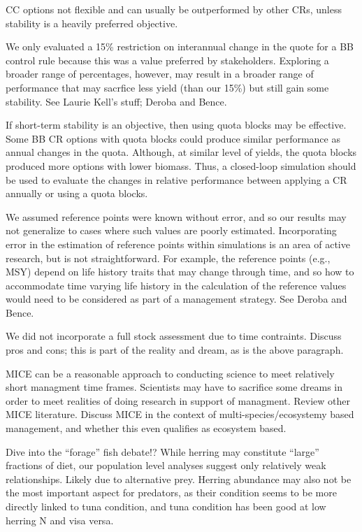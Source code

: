 \documentclass[]{article}
\begin{document}
CC options not flexible and can usually be outperformed by other CRs,
unless stability is a heavily preferred objective.

We only evaluated a 15\% restriction on interannual change in the quote
for a BB control rule because this was a value preferred by
stakeholders. Exploring a broader range of percentages, however, may
result in a broader range of performance that may sacrfice less yield
(than our 15\%) but still gain some stability. See Laurie Kell's stuff;
Deroba and Bence.

If short-term stability is an objective, then using quota blocks may be
effective. Some BB CR options with quota blocks could produce similar
performance as annual changes in the quota. Although, at similar level
of yields, the quota blocks produced more options with lower biomass.
Thus, a closed-loop simulation should be used to evaluate the changes in
relative performance between applying a CR annually or using a quota
blocks.

We assumed reference points were known without error, and so our results
may not generalize to cases where such values are poorly estimated.
Incorporating error in the estimation of reference points within
simulations is an area of active research, but is not straightforward.
For example, the reference points (e.g., MSY) depend on life history
traits that may change through time, and so how to accommodate time
varying life history in the calculation of the reference values would
need to be considered as part of a management strategy. See Deroba and
Bence.

We did not incorporate a full stock assessment due to time contraints.
Discuss pros and cons; this is part of the reality and dream, as is the
above paragraph.

MICE can be a reasonable approach to conducting science to meet
relatively short managment time frames. Scientists may have to sacrifice
some dreams in order to meet realities of doing research in support of
managment. Review other MICE literature. Discuss MICE in the context of
multi-species/ecosystemy based management, and whether this even
qualifies as ecosystem based.

Dive into the ``forage'' fish debate!? While herring may constitute
``large'' fractions of diet, our population level analyses suggest only
relatively weak relationships. Likely due to alternative prey. Herring
abundance may also not be the most important aspect for predators, as
their condition seems to be more directly linked to tuna condition, and
tuna condition has been good at low herring N and visa versa.
\end{document}
